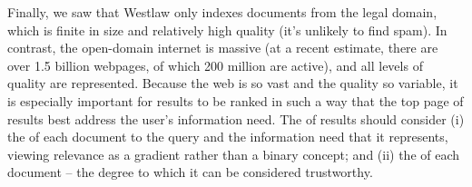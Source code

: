 Finally, we saw that Westlaw only indexes documents from the legal domain, which is finite in size and relatively high quality (it's unlikely to find spam).  In contrast, the open-domain internet is massive (at a recent estimate, there are over 1.5 billion webpages, of which 200 million are active), and all levels of quality are represented.  Because the web is so vast and the quality so variable, it is especially important for results to be ranked in such a way that the top page of results best address the user's information need.  The  of results should consider (i) the  of each document to the query and the information need that it represents, viewing relevance as a gradient rather than a binary concept; and (ii) the  of each document -- the degree to which it can be considered trustworthy.  

 









% 



